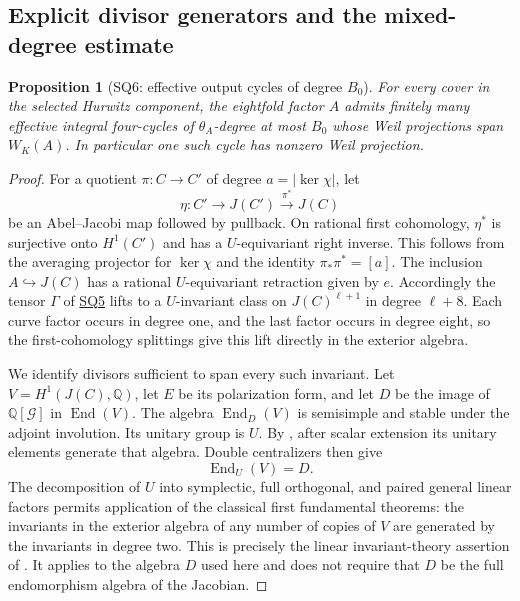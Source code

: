 \documentclass[11pt,a4paper]{article}
\newtheorem{proposition}[theorem]{Proposition}
\theoremstyle{definition}\newtheorem{definition}[theorem]{Definition}
\theoremstyle{remark}\newtheorem{remark}[theorem]{Remark}
\newcommand{\Q}{\mathbb Q}\newcommand{\Z}{\mathbb Z}\newcommand{\C}{\mathbb C}\newcommand{\R}{\mathbb R}
\newcommand{\End}{\operatorname{End}}\newcommand{\NS}{\operatorname{NS}}\newcommand{\Hom}{\operatorname{Hom}}
\newcommand{\findingref}[1]{\hyperref[#1]{\textsf{#1}}}
\begin{document}
\subsection{Explicit divisor generators and the mixed-degree estimate}

\begin{proposition}[SQ6: effective output cycles of degree $B_0$]\label{SQ6}
For every cover in the selected Hurwitz component, the eightfold factor $A$ admits finitely many effective integral four-cycles of $\theta_A$-degree at most $B_0$ whose Weil projections span $W_K(A)$. In particular one such cycle has nonzero Weil projection.
\end{proposition}
\begin{proof}
For a quotient $\pi:C\to C'$ of degree $a=|\ker\chi|$, let
\[
 \eta:C'\longrightarrow J(C')\xrightarrow{\pi^*}J(C)
\]
be an Abel--Jacobi map followed by pullback. On rational first cohomology, $\eta^*$ is surjective onto $H^1(C')$ and has a $U$-equivariant right inverse. This follows from the averaging projector for $\ker\chi$ and the identity $\pi_*\pi^*=[a]$. The inclusion $A\hookrightarrow J(C)$ has a rational $U$-equivariant retraction given by $e$. Accordingly the tensor $\Gamma$ of \findingref{SQ5} lifts to a $U$-invariant class on $J(C)^{\ell+1}$ in degree $\ell+8$. Each curve factor occurs in degree one, and the last factor occurs in degree eight, so the first-cohomology splittings give this lift directly in the exterior algebra.

We identify divisors sufficient to span every such invariant. Let $V=H^1(J(C),\Q)$, let $E$ be its polarization form, and let $D$ be the image of $\Q[\mathcal G]$ in $\End(V)$. The algebra $\End_D(V)$ is semisimple and stable under the adjoint involution. Its unitary group is $U$. By \citet[Lemma~3.5]{Milne99}, after scalar extension its unitary elements generate that algebra. Double centralizers then give
\[
 \End_U(V)=D.
\]
The decomposition of $U$ into symplectic, full orthogonal, and paired general linear factors permits application of the classical first fundamental theorems: the invariants in the exterior algebra of any number of copies of $V$ are generated by the invariants in degree two. This is precisely the linear invariant-theory assertion of \citet[Proposition~3.6 and Remark~3.7]{Milne99}. It applies to the algebra $D$ used here and does not require that $D$ be the full endomorphism algebra of the Jacobian.


\end{proof}
\end{document}
